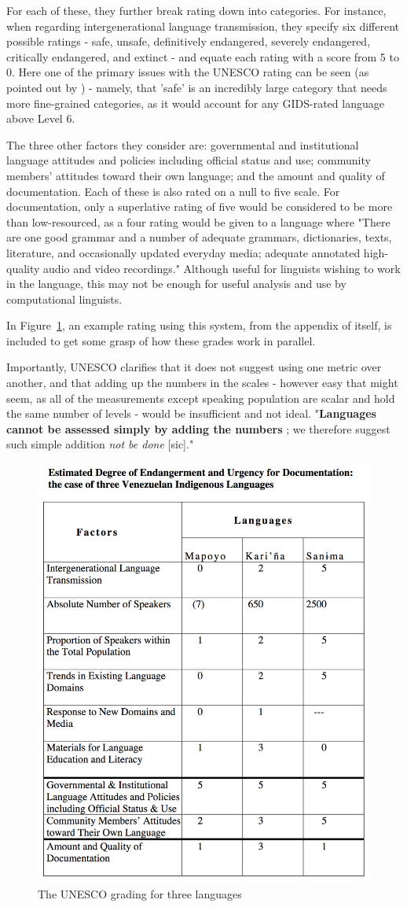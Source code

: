 For each of these, they further break rating down into categories. For instance, when regarding intergenerational language transmission, they specify six different possible ratings - safe, unsafe, definitively endangered, severely endangered, critically endangered, and extinct - and equate each rating with a score from 5 to 0. Here one of the primary issues with the UNESCO rating can be seen  (as pointed out by \citet{lewis2010assessing}) - namely, that 'safe' is an incredibly large category that needs more fine-grained categories, as it would account for any GIDS-rated language above Level 6.

The three other factors they consider are: governmental and institutional language attitudes and policies including official status and use; community members' attitudes toward their own language; and the amount and quality of documentation. Each of these is also rated on a null to five scale. For documentation, only a superlative rating of five would be considered to be more than low-resourced, as a four rating would be given to a language where "There are one good grammar and a number of adequate grammars, dictionaries, texts, literature, and occasionally updated everyday media; adequate annotated high-quality audio and video recordings." Although useful for linguists wishing to work in the language, this may not be enough for useful analysis and use by computational linguists. %

In Figure~\ref{fig:unesco}, an example rating using this system, from the appendix of \citet{brenzinger2003language} itself, is included to get some grasp of how these grades work in parallel.

Importantly, UNESCO clarifies that it does not suggest using one metric over another, and that adding up the numbers in the scales - however easy that might seem, as all of the measurements except speaking population are scalar and hold the same number of levels - would be insufficient and not ideal. "\textbf{Languages cannot be assessed simply by adding the numbers
}; we therefore suggest such simple addition \textit{not be done} [sic]."

\begin{figure}
 \centering
 \includegraphics[width=.5\textwidth]{img/unesco.png}
 \caption{The UNESCO grading for three languages \citep{brenzinger2003language}}
 \label{fig:unesco}
\end{figure}

